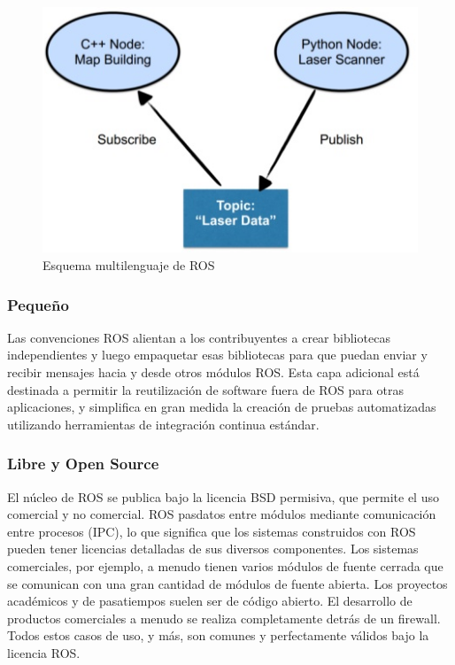             \begin{figure}[htb]
                \centering
                \includegraphics[width=0.55\linewidth]{Main/Chapter3/Images3/multilenguaje_1.png}
                \caption{Esquema multilenguaje de ROS}
                \label{f:Cap3-5_multilenguaje_ros}
            \end{figure}

\newpage
            
        \subsubsection{Pequeño}
        
            Las convenciones ROS alientan a los contribuyentes a crear bibliotecas independientes y luego empaquetar esas bibliotecas para que puedan enviar y recibir mensajes hacia y desde otros módulos ROS. Esta capa adicional está destinada a permitir la reutilización de software fuera de ROS para otras aplicaciones, y simplifica en gran medida la creación de pruebas automatizadas utilizando herramientas de integración continua estándar.
            
        \subsubsection{Libre y Open Source}
        
            El núcleo de ROS se publica bajo la licencia BSD permisiva, que permite el uso comercial y no comercial. ROS pas\subsua datos entre módulos mediante comunicación entre procesos (IPC), lo que significa que los sistemas construidos con ROS pueden tener licencias detalladas de sus diversos componentes. Los sistemas comerciales, por ejemplo, a menudo tienen varios módulos de fuente cerrada que se comunican con una gran cantidad de módulos de fuente abierta. Los proyectos académicos y de pasatiempos suelen ser de código abierto. El desarrollo de productos comerciales a menudo se realiza completamente detrás de un firewall. Todos estos casos de uso, y más, son comunes y perfectamente válidos bajo la licencia ROS.
            
